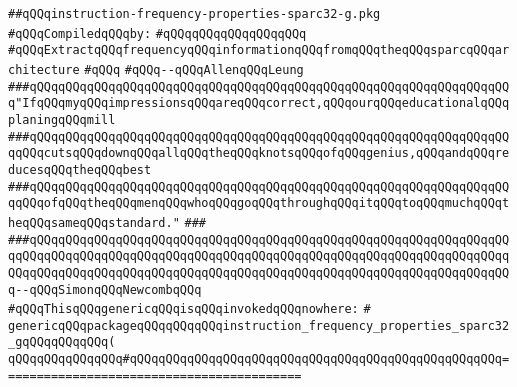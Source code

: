 \label{src/lib/compiler/back/low/sparc32/code/instruction-frequency-properties-sparc32-g.pkg}
\verb|##qQQqinstruction-frequency-properties-sparc32-g.pkg|\newline
\newline
\verb|#qQQqCompiledqQQqby:|\newline
\verb|#qQQqqQQqqQQqqQQqqQQq|\newline
\newline
\newline
\newline
\newline
\verb|#qQQqExtractqQQqfrequencyqQQqinformationqQQqfromqQQqtheqQQqsparcqQQqarchitecture|\newline
\verb|#qQQq|\newline
\verb|#qQQq--qQQqAllenqQQqLeung|\newline
\newline
\newline
\newline
\verb|###qQQqqQQqqQQqqQQqqQQqqQQqqQQqqQQqqQQqqQQqqQQqqQQqqQQqqQQqqQQqqQQqqQQq"IfqQQqmyqQQqimpressionsqQQqareqQQqcorrect,qQQqourqQQqeducationalqQQqplaningqQQqmill|\newline
\verb|###qQQqqQQqqQQqqQQqqQQqqQQqqQQqqQQqqQQqqQQqqQQqqQQqqQQqqQQqqQQqqQQqqQQqqQQqcutsqQQqdownqQQqallqQQqtheqQQqknotsqQQqofqQQqgenius,qQQqandqQQqreducesqQQqtheqQQqbest|\newline
\verb|###qQQqqQQqqQQqqQQqqQQqqQQqqQQqqQQqqQQqqQQqqQQqqQQqqQQqqQQqqQQqqQQqqQQqqQQqofqQQqtheqQQqmenqQQqwhoqQQqgoqQQqthroughqQQqitqQQqtoqQQqmuchqQQqtheqQQqsameqQQqstandard."|\newline
\verb|###|\newline
\verb|###qQQqqQQqqQQqqQQqqQQqqQQqqQQqqQQqqQQqqQQqqQQqqQQqqQQqqQQqqQQqqQQqqQQqqQQqqQQqqQQqqQQqqQQqqQQqqQQqqQQqqQQqqQQqqQQqqQQqqQQqqQQqqQQqqQQqqQQqqQQqqQQqqQQqqQQqqQQqqQQqqQQqqQQqqQQqqQQqqQQqqQQqqQQqqQQqqQQqqQQqqQQqqQQq--qQQqSimonqQQqNewcombqQQq|\newline
\newline
\newline
\verb|#qQQqThisqQQqgenericqQQqisqQQqinvokedqQQqnowhere:|\newline
\verb|#|\newline
\verb|genericqQQqpackageqQQqqQQqqQQqinstruction_frequency_properties_sparc32_gqQQqqQQqqQQq(|\newline
\verb|qQQqqQQqqQQqqQQq#qQQqqQQqqQQqqQQqqQQqqQQqqQQqqQQqqQQqqQQqqQQqqQQqqQQq==========================================|\newline
